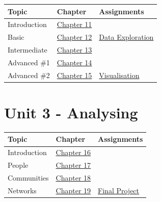 \documentclass[
  letterpaper,
  DIV=11,
  numbers=noendperiod]{scrreprt}
\begin{document}
\begin{longtable}[]{@{}
  >{\centering\arraybackslash}p{}
  >{\centering\arraybackslash}p{}
  >{\centering\arraybackslash}p{}@{}}
\toprule\noalign{}
\begin{minipage}[b]{\linewidth}\centering
Topic
\end{minipage} & \begin{minipage}[b]{\linewidth}\centering
Chapter
\end{minipage} & \begin{minipage}[b]{\linewidth}\centering
Assignments
\end{minipage} \\
\midrule\noalign{}
\endhead
\bottomrule\noalign{}
\endlastfoot
Introduction & \href{Unit\%202.qmd}{Chapter 11} & \\
Basic & \href{Basic\%20Visualisation.qmd}{Chapter 12} &
\href{A3_Data\%20Exploration.qmd}{Data Exploration} \\
Intermediate & \href{Intermediate\%20Visualisation.qmd}{Chapter 13} & \\
Advanced \#1 &
\href{Advanced\%20Visualisation\%20-\%20Interactive.qmd}{Chapter 14}
& \\
Advanced \#2 &
\href{Advanced\%20Visualisation\%20-\%20Dynamic.qmd}{Chapter 15} &
\href{A4_Visualisations.qmd}{Visualisation} \\
\end{longtable}

\section{Unit 3 - Analysing}\label{unit-3---analysing}

\begin{longtable}[]{@{}
  >{\centering\arraybackslash}p{}
  >{\centering\arraybackslash}p{}
  >{\centering\arraybackslash}p{}@{}}
\toprule\noalign{}
\begin{minipage}[b]{\linewidth}\centering
Topic
\end{minipage} & \begin{minipage}[b]{\linewidth}\centering
Chapter
\end{minipage} & \begin{minipage}[b]{\linewidth}\centering
Assignments
\end{minipage} \\
\midrule\noalign{}
\endhead
\bottomrule\noalign{}
\endlastfoot
Introduction & \href{Unit\%203.qmd}{Chapter 16} & \\
People & \href{People\%20In\%20Networks.qmd}{Chapter 17} & \\
Communities & \href{Communities\%20in\%20Networks.qmd}{Chapter 18} & \\
Networks & \href{Networks\%20of\%20People.qmd}{Chapter 19} &
\href{Final\%20Project\%20Instructions.qmd}{Final Project} \\
\end{longtable}
\end{document}
